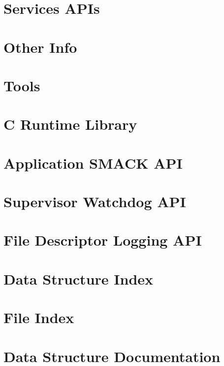 \documentclass[twoside]{book}
\newcommand{\+}{\discretionary{\mbox{\scriptsize$\hookleftarrow$}}{}{}}
\begin{document}
\chapter{Services A\+P\+Is}
\label{legato_services}
\hypertarget{legato_services}{}

\chapter{Other Info}
\label{other_info}
\hypertarget{other_info}{}

\chapter{Tools}
\label{tools}
\hypertarget{tools}{}

\chapter{C Runtime Library}
\label{c__a_p_is}
\hypertarget{c__a_p_is}{}

\chapter{Application S\+M\+A\+C\+K A\+P\+I}
\label{c_app_smack}
\hypertarget{c_app_smack}{}

\chapter{Supervisor Watchdog A\+P\+I}
\label{c_sup_wdog}
\hypertarget{c_sup_wdog}{}

\chapter{File Descriptor Logging A\+P\+I}
\label{c_log_fd}
\hypertarget{c_log_fd}{}

\chapter{Data Structure Index}

\chapter{File Index}

\chapter{Data Structure Documentation}






\end{document}

